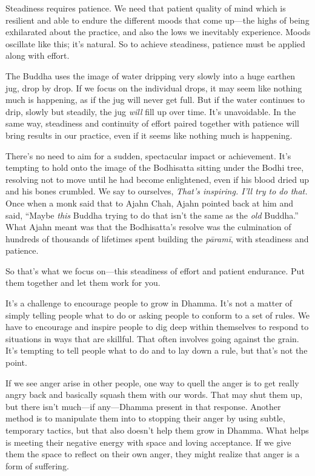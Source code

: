 Steadiness requires patience. We need that patient quality of mind 
which is resilient and able to endure the different moods that come 
up---the highs of being exhilarated about the practice, and also the 
lows we inevitably experience. Moods oscillate like this; it's natural. 
So to achieve steadiness, patience must be applied along with effort.

The Buddha uses the image of water dripping very slowly into a huge 
earthen jug, drop by drop. If we focus on the individual drops, it may 
seem like nothing much is happening, as if the jug will never get full. 
But if the water continues to drip, slowly but steadily, the jug 
\emph{will} fill up over time. It's unavoidable. In the same way, 
steadiness and continuity of effort paired together with patience will 
bring results in our practice, even if it seems like nothing much is 
happening.

There's no need to aim for a sudden, spectacular impact or achievement. 
It's tempting to hold onto the image of the Bodhisatta sitting under 
the Bodhi tree, resolving not to move until he had become enlightened, 
even if his blood dried up and his bones crumbled. We say to ourselves, 
\emph{That's inspiring. I'll try to do that.} Once when a monk said 
that to Ajahn Chah, Ajahn pointed back at him and said, ``Maybe 
\emph{this} Buddha trying to do that isn't the same as the \emph{old} 
Buddha.'' What Ajahn meant was that the Bodhisatta's resolve was the 
culmination of hundreds of thousands of lifetimes spent building the 
\emph{pāramī}, with steadiness and patience.

So that's what we focus on---this steadiness of effort and patient 
endurance. Put them together and let them work for you.


It's a challenge to encourage people to grow in Dhamma. It's not a 
matter of simply telling people what to do or asking people to conform 
to a set of rules. We have to encourage and inspire people to dig deep 
within themselves to respond to situations in ways that are skillful. 
That often involves going against the grain. It's tempting to tell 
people what to do and to lay down a rule, but that's not the point.

If we see anger arise in other people, one way to quell the anger is to 
get really angry back and basically squash them with our words. That 
may shut them up, but there isn't much---if any---Dhamma present in 
that response. Another method is to manipulate them into to stopping 
their anger by using subtle, temporary tactics, but that also doesn't 
help them grow in Dhamma. What helps is meeting their negative energy 
with space and loving acceptance. If we give them the space to reflect 
on their own anger, they might realize that anger is a form of 
suffering.

